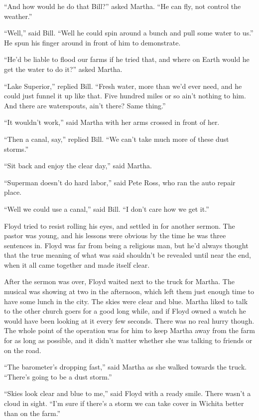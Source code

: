 \documentclass[ebook,12pt]{memoir}
\begin{document}
``And how would he do that Bill?'' asked Martha. ``He can fly, not
control the weather.''

``Well,'' said Bill. ``Well he could spin around a bunch and pull some
water to us.'' He spun his finger around in front of him to demonstrate.

``He'd be liable to flood our farms if he tried that, and where on Earth
would he get the water to do it?'' asked Martha.

``Lake Superior,'' replied Bill. ``Fresh water, more than we'd ever
need, and he could just funnel it up like that. Five hundred miles or so
ain't nothing to him. And there are waterspouts, ain't there? Same
thing.''

``It wouldn't work,'' said Martha with her arms crossed in front of her.

``Then a canal, say,'' replied Bill. ``We can't take much more of these
dust storms.''

``Sit back and enjoy the clear day,'' said Martha.

``Superman doesn't do hard labor,'' said Pete Ross, who ran the auto
repair place.

``Well we could use a canal,'' said Bill. ``I don't care how we get
it.''

Floyd tried to resist rolling his eyes, and settled in for another
sermon. The pastor was young, and his lessons were obvious by the time
he was three sentences in. Floyd was far from being a religious man, but
he'd always thought that the true meaning of what was said shouldn't be
revealed until near the end, when it all came together and made itself
clear.

After the sermon was over, Floyd waited next to the truck for Martha.
The musical was showing at two in the afternoon, which left them just
enough time to have some lunch in the city. The skies were clear and
blue. Martha liked to talk to the other church goers for a good long
while, and if Floyd owned a watch he would have been looking at it every
few seconds. There was no real hurry though. The whole point of the
operation was for him to keep Martha away from the farm for as long as
possible, and it didn't matter whether she was talking to friends or on
the road.

``The barometer's dropping fast,'' said Martha as she walked towards the
truck. ``There's going to be a dust storm.''

``Skies look clear and blue to me,'' said Floyd with a ready smile.
There wasn't a cloud in sight. ``I'm sure if there's a storm we can take
cover in Wichita better than on the farm.''
\end{document}
